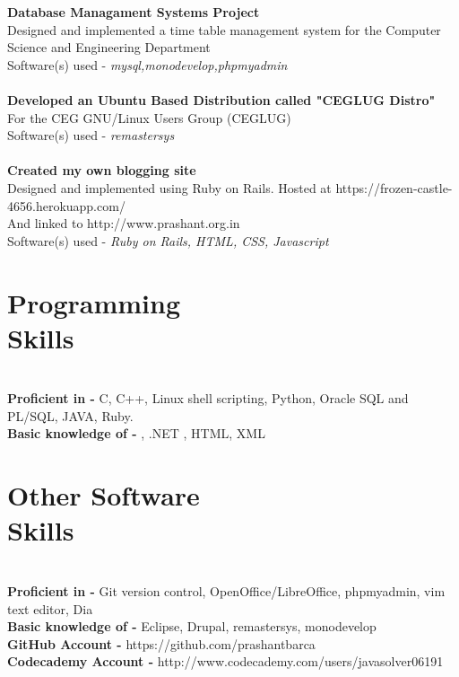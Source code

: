 \documentclass[margin,line]{resume}
\begin{document}
\begin{resume}
    \textbf{Database Managament Systems Project} \\Designed and implemented a time table management system for the Computer Science and Engineering Department \vspace{2mm}\\\vspace{1mm}%
    Software(s) used -  \textsl{mysql,monodevelop,phpmyadmin}\\
    \\\textbf{Developed an Ubuntu Based Distribution called "CEGLUG Distro"} \\For the CEG GNU/Linux Users Group (CEGLUG) \vspace{2mm}\\\vspace{1mm}%
    Software(s) used -  \textsl{remastersys}\\
    \\\textbf{Created my own blogging site} \\Designed and implemented using Ruby on Rails. Hosted at https://frozen-castle-4656.herokuapp.com/ \\ And linked to http://www.prashant.org.in \vspace{2mm}\\\vspace{1mm}%
    Software(s) used -  \textsl{Ruby on Rails, HTML, CSS, Javascript}\\

    \section{\mysidestyle Programming\\Skills}\\ 
    \textbf{Proficient in -}  C, C++,  Linux shell scripting, Python, Oracle SQL and PL/SQL, JAVA, Ruby. 
\\\textbf{Basic knowledge of -}  \LaTeXe, .NET , HTML, XML

    \section{\mysidestyle Other Software\\Skills} \\
    \textbf{Proficient in -}  Git version control, OpenOffice/LibreOffice, phpmyadmin, vim text editor, Dia
\\\textbf{Basic knowledge of -} Eclipse, Drupal, remastersys, monodevelop\\
    \textbf{GitHub Account -}  https://github.com/prashantbarca
    \\\textbf{Codecademy Account -}  http://www.codecademy.com/users/javasolver06191

\end{resume}
\end{document}
